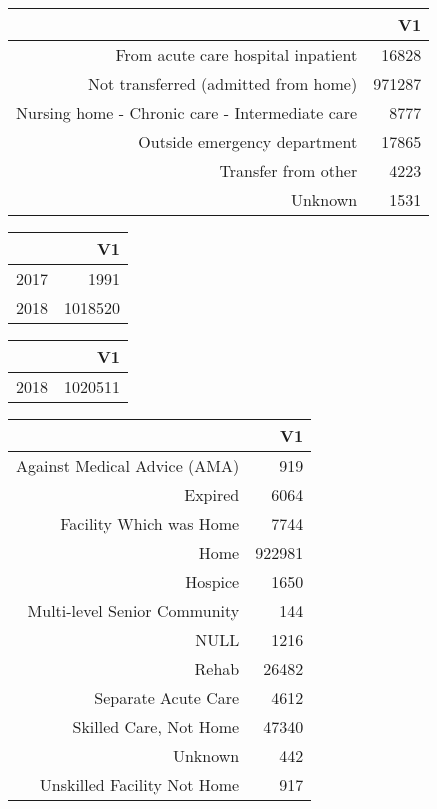 \bigskip\bigskip
\centering
\begin{tabular}{rr}
  \hline
 & V1 \\ 
  \hline
From acute care hospital inpatient & 16828 \\ 
  Not transferred (admitted from home) & 971287 \\ 
  Nursing home - Chronic care - Intermediate care & 8777 \\ 
  Outside emergency department & 17865 \\ 
  Transfer from other & 4223 \\ 
  Unknown & 1531 \\ 
   \hline
\end{tabular}

\bigskip\bigskip
\centering
\begin{tabular}{rr}
  \hline
 & V1 \\ 
  \hline
2017 & 1991 \\ 
  2018 & 1018520 \\ 
   \hline
\end{tabular}

\bigskip\bigskip
\centering
\begin{tabular}{rr}
  \hline
 & V1 \\ 
  \hline
2018 & 1020511 \\ 
   \hline
\end{tabular}

\bigskip\bigskip
\centering
\begin{tabular}{rr}
  \hline
 & V1 \\ 
  \hline
Against Medical Advice (AMA) & 919 \\ 
  Expired & 6064 \\ 
  Facility Which was Home & 7744 \\ 
  Home & 922981 \\ 
  Hospice & 1650 \\ 
  Multi-level Senior Community & 144 \\ 
  NULL & 1216 \\ 
  Rehab & 26482 \\ 
  Separate Acute Care & 4612 \\ 
  Skilled Care, Not Home & 47340 \\ 
  Unknown & 442 \\ 
  Unskilled Facility Not Home & 917 \\ 
   \hline
\end{tabular}

